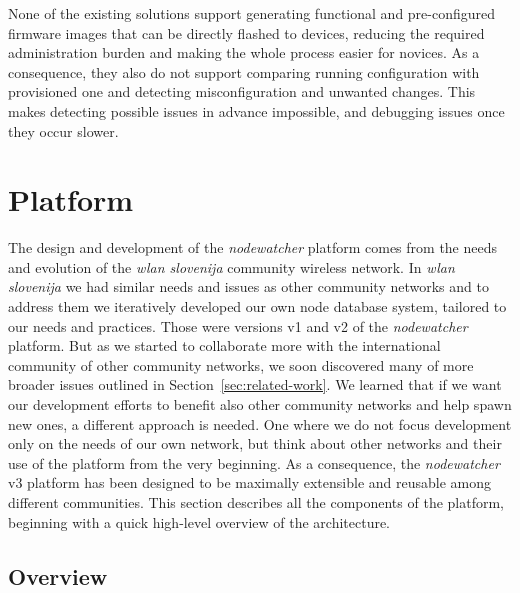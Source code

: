 \documentclass[5p,sort&compress]{elsarticle}
\newcommand{\nodewatcher}{\textit{nodewatcher}}
\newcommand{\wlanslovenija}{\textit{wlan slovenija}}
\begin{document}
None of the existing solutions support generating functional and pre-configured firmware images that can be directly flashed to devices, reducing the required administration burden and making the whole process easier for novices.
As a consequence, they also do not support comparing running configuration with provisioned one and detecting misconfiguration and unwanted changes.
This makes detecting possible issues in advance impossible, and debugging issues once they occur slower.

\section{Platform}
\label{sec:platform}

The design and development of the \nodewatcher{} platform comes from the needs and evolution of the \wlanslovenija{} community wireless network.
In \wlanslovenija{} we had similar needs and issues as other community networks and to address them we iteratively developed our own node database system, tailored to our needs and practices.
Those were versions v1 and v2 of the \nodewatcher{} platform.
But as we started to collaborate more with the international community of other community networks, we soon discovered many of more broader issues outlined in Section~\ref{sec:related-work}.
We learned that if we want our development efforts to benefit also other community networks and help spawn new ones, a different approach is needed.
One where we do not focus development only on the needs of our own network, but think about other networks and their use of the platform from the very beginning.
As a consequence, the \nodewatcher{} v3 platform has been designed to be maximally extensible and reusable among different communities.
This section describes all the components of the platform, beginning with a quick high-level overview of the architecture.

\subsection{Overview}
\end{document}
